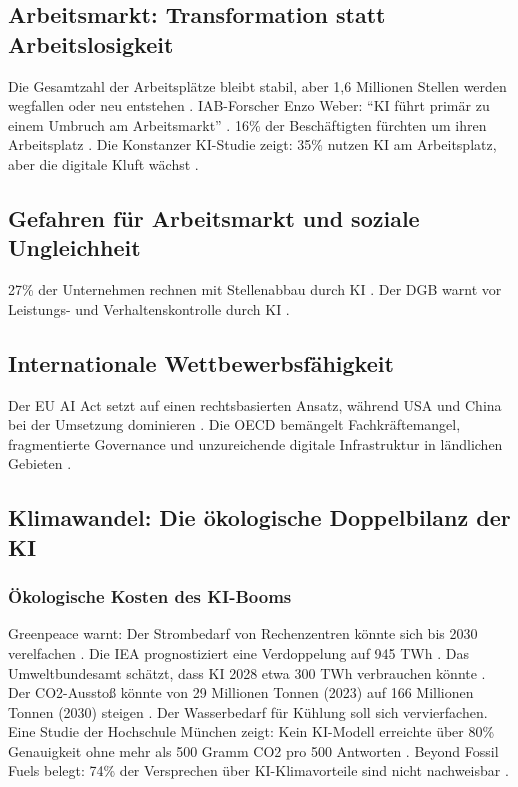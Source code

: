 \documentclass[12pt,a4paper]{article}
\begin{document}
	\subsection{Arbeitsmarkt: Transformation statt Arbeitslosigkeit}
	
	Die Gesamtzahl der Arbeitsplätze bleibt stabil, aber 1,6 Millionen Stellen werden wegfallen oder neu entstehen \cite{IAB2025a}. IAB-Forscher Enzo Weber: \enquote{KI führt primär zu einem Umbruch am Arbeitsmarkt} \cite{IAB2025a}. 16\% der Beschäftigten fürchten um ihren Arbeitsplatz \cite{XING2025}. Die Konstanzer KI-Studie zeigt: 35\% nutzen KI am Arbeitsplatz, aber die digitale Kluft wächst \cite{Konstanz2025}.
	
	\subsection{Gefahren für Arbeitsmarkt und soziale Ungleichheit}
	
	27\% der Unternehmen rechnen mit Stellenabbau durch KI \cite{ifo2025}. Der DGB warnt vor Leistungs- und Verhaltenskontrolle durch KI \cite{DGB2025}.
	
	\subsection{Internationale Wettbewerbsfähigkeit}
	
	Der EU AI Act setzt auf einen rechtsbasierten Ansatz, während USA und China bei der Umsetzung dominieren \cite{GlobalAI2025}. Die OECD bemängelt Fachkräftemangel, fragmentierte Governance und unzureichende digitale Infrastruktur in ländlichen Gebieten \cite{OECD2025}.
	
	\subsection{Klimawandel: Die ökologische Doppelbilanz der KI}
	
	\subsubsection{Ökologische Kosten des KI-Booms}
	
	Greenpeace warnt: Der Strombedarf von Rechenzentren könnte sich bis 2030 verelfachen \cite{Greenpeace2025}. Die IEA prognostiziert eine Verdoppelung auf 945 TWh \cite{IEA2025}. Das Umweltbundesamt schätzt, dass KI 2028 etwa 300 TWh verbrauchen könnte \cite{UBA2025}. Der CO2-Ausstoß könnte von 29 Millionen Tonnen (2023) auf 166 Millionen Tonnen (2030) steigen \cite{Oeko2025}. Der Wasserbedarf für Kühlung soll sich vervierfachen. Eine Studie der Hochschule München zeigt: Kein KI-Modell erreichte über 80\% Genauigkeit ohne mehr als 500 Gramm CO2 pro 500 Antworten \cite{HM2025}. Beyond Fossil Fuels belegt: 74\% der Versprechen über KI-Klimavorteile sind nicht nachweisbar \cite{BeyondFossil2026}.
	
\end{document}
